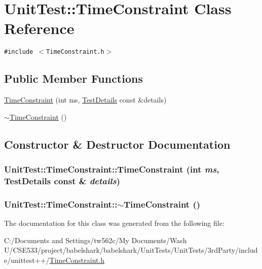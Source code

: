 \hypertarget{class_unit_test_1_1_time_constraint}{
\section{UnitTest::TimeConstraint Class Reference}
\label{class_unit_test_1_1_time_constraint}
}
{\tt \#include $<$TimeConstraint.h$>$}

\subsection*{Public Member Functions}
\begin{CompactItemize}
\item 
\hyperlink{class_unit_test_1_1_time_constraint_d5d0218240ae8cf49893ff57a967b25b}{TimeConstraint} (int ms, \hyperlink{class_unit_test_1_1_test_details}{TestDetails} const \&details)
\item 
\hyperlink{class_unit_test_1_1_time_constraint_f315e8e723ca96003e341488cd5bb65e}{$\sim$TimeConstraint} ()
\end{CompactItemize}


\subsection{Constructor \& Destructor Documentation}
\hypertarget{class_unit_test_1_1_time_constraint_d5d0218240ae8cf49893ff57a967b25b}{
\subsubsection[{TimeConstraint}]{\setlength{\rightskip}{0pt plus 5cm}UnitTest::TimeConstraint::TimeConstraint (int {\em ms}, \/  {\bf TestDetails} const \& {\em details})}}
\label{class_unit_test_1_1_time_constraint_d5d0218240ae8cf49893ff57a967b25b}


\hypertarget{class_unit_test_1_1_time_constraint_f315e8e723ca96003e341488cd5bb65e}{
\subsubsection[{$\sim$TimeConstraint}]{\setlength{\rightskip}{0pt plus 5cm}UnitTest::TimeConstraint::$\sim$TimeConstraint ()}}
\label{class_unit_test_1_1_time_constraint_f315e8e723ca96003e341488cd5bb65e}




The documentation for this class was generated from the following file:\begin{CompactItemize}
\item 
C:/Documents and Settings/tw562c/My Documents/Wash U/CSE533/project/babelshark/babelshark/UnitTests/UnitTests/3rdParty/include/unittest++/\hyperlink{_time_constraint_8h}{TimeConstraint.h}\end{CompactItemize}

